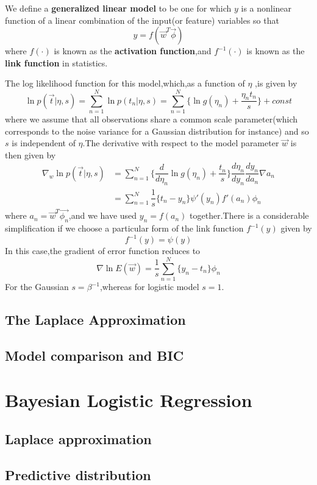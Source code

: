 We define a \textbf{generalized linear model} to be one for which $y$ is a nonlinear function of a linear combination of the input(or feature) variables so that
\begin{equation}
y=f(\vec{w}^T\vec{\phi})
\end{equation}
where $f(\cdot)$ is known as the \textbf{activation function},and $f^{-1}(\cdot)$ is known as the \textbf{link function} in statistics.

The log likelihood function for this model,which,as a function of $\eta$ ,is given by 
\begin{equation}
\ln p(\vec{t}|\eta,s) = \sum_{n=1}^{N}\ln p(t_n|\eta,s) = \sum_{n=1}^{N}\{\ln g(\eta_n)+\dfrac{\eta_n t_n}{s} \} + const
\end{equation}
where we assume that all observations share a common scale parameter(which corresponds to the noise variance for a Gaussian distribution for instance) and so $s$ is independent of $\eta$.The derivative with respect to the model parameter $\vec{w}$ is then given by 
\begin{align}
\nabla_w\ln p(\vec{t}|\eta,s) 
&=\sum_{n=1}^{N}\{\dfrac{d}{d\eta_n}\ln g(\eta_n)+\dfrac{t_n}{s} \} \dfrac{d\eta_n}{dy_n}\dfrac{dy_n}{da_n}\nabla a_n \\
&= \sum_{n=1}^{N}\dfrac{1}{s}\{t_n-y_n \}\psi'(y_n)f'(a_n)\phi_n
\end{align}
where $a_n=\vec{w}^T\vec{\phi_n}$,and we have used $y_n=f(a_n)$ together.There is a considerable simplification if we choose a particular form of the link function $f^{-1}(y)$ given by
\begin{equation}
f^{-1}(y) = \psi(y)
\end{equation}
In this case,the gradient of error function reduces to 
\begin{equation}
\nabla\ln E(\vec{w}) = \dfrac{1}{s}\sum_{n=1}^{N}\{y_n-t_n\}\phi_n
\end{equation}
For the Gaussian $s=\beta^{-1}$,whereas for logistic model $s=1$.



\subsection{The Laplace Approximation}
\subsection{Model comparison and BIC}

\section{Bayesian Logistic Regression}
\subsection{Laplace approximation}
\subsection{Predictive distribution}
